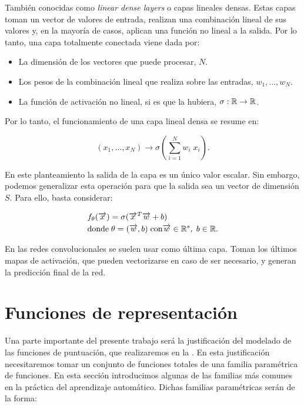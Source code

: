 También conocidas como \textit{linear dense layers} o capas lineales densas. Estas capas toman un vector de valores de entrada, realizan una combinación lineal de sus valores y, en la mayoría de casos, aplican una función no lineal a la salida. Por lo tanto, una capa totalmente conectada viene dada por:

\begin{itemize}
    \item La dimensión de los vectores que puede procesar, $N$.
    \item Los pesos de la combinación lineal que realiza sobre las entradas, $w_1, \ldots, w_N$.
    \item La función de activación no lineal, si es que la hubiera, $\sigma: \mathbb{R} \to \mathbb{R}$.
\end{itemize}

Por lo tanto, el funcionamiento de una capa lineal densa se resume en:

\begin{equation}
    (x_1, \ldots, x_N) \to \sigma(\sum_{i = 1}^{N} w_i \; x_i).
\end{equation}

En este planteamiento la salida de la capa es un único valor escalar. Sin embargo, podemos generalizar esta operación para que la salida sea un vector de dimensión $S$. Para ello, basta considerar:

\begin{equation}
\begin{split}
    & f_\theta(\overrightarrow{x}) = \sigma(\overrightarrow{x}^T \overrightarrow{w} + b) \\
    & \text{donde} \; \theta = (\overrightarrow{w}, b) \; \text{con} \overrightarrow{w} \in \mathbb{R}^s, \; b \in \mathbb{R}.
\end{split}
\end{equation}

En las redes convolucionales se suelen usar como última capa. Toman los últimos mapas de activación, que pueden vectorizarse en caso de ser necesario, y generan la predicción final de la red.

\section{Funciones de representación} \label{sec:funciones_representacion}

Una parte importante del presente trabajo será la justificación del modelado de las funciones de puntuación, que realizaremos en la . En esta justificación necesitaremos tomar un conjunto de funciones totales de una familia paramétrica de funciones. En esta sección introducimos algunas de las familias más comunes en la práctica del aprendizaje automático. Dichas familias paramétricas serán de la forma:


